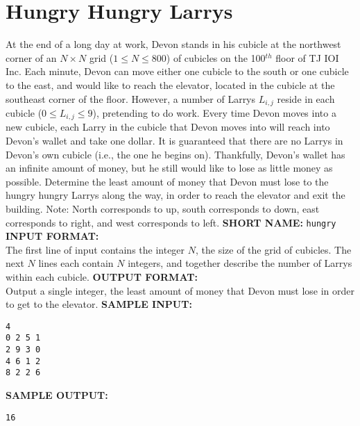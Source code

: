\section{Hungry Hungry Larrys}

At the end of a long day at work, Devon stands in his cubicle at the northwest corner of an $ N \times N $ grid ($ 1 \leq N \leq 800 $) of cubicles on the 100$^{th}$ floor of TJ IOI Inc.  Each minute, Devon can move either one cubicle to the south or one cubicle to the east, and would like to reach the elevator, located in the cubicle at the southeast corner of the floor.
\blank
However, a number of Larrys $ L_{i, j} $ reside in each cubicle ($ 0 \leq L_{i, j} \leq 9 $), pretending to do work.  Every time Devon moves into a new cubicle, each Larry in the cubicle that Devon moves into will reach into Devon’s wallet and take one dollar.  It is guaranteed that there are no Larrys in Devon's own cubicle (i.e., the one he begins on).
\blank
Thankfully, Devon’s wallet has an infinite amount of money, but he still would like to lose as little money as possible.  Determine the least amount of money that Devon must lose to the hungry hungry Larrys along the way, in order to reach the elevator and exit the building.
\blank
Note: North corresponds to up, south corresponds to down, east corresponds to right, and west corresponds to left.
\blank
\textbf{SHORT NAME:} \verb|hungry|
\blank
\textbf{INPUT FORMAT:}\\
The first line of input contains the integer $ N $, the size of the grid of cubicles.  The next $ N $ lines each contain $ N $ integers, and together describe the number of Larrys within each cubicle.
\blank
\textbf{OUTPUT FORMAT:}\\
Output a single integer, the least amount of money that Devon must lose in order to get to the elevator.
\blank
\textbf{SAMPLE INPUT:}
\begin{verbatim}
4
0 2 5 1
2 9 3 0
4 6 1 2
8 2 2 6
\end{verbatim}
\textbf{SAMPLE OUTPUT:}
\begin{verbatim}
16
\end{verbatim}